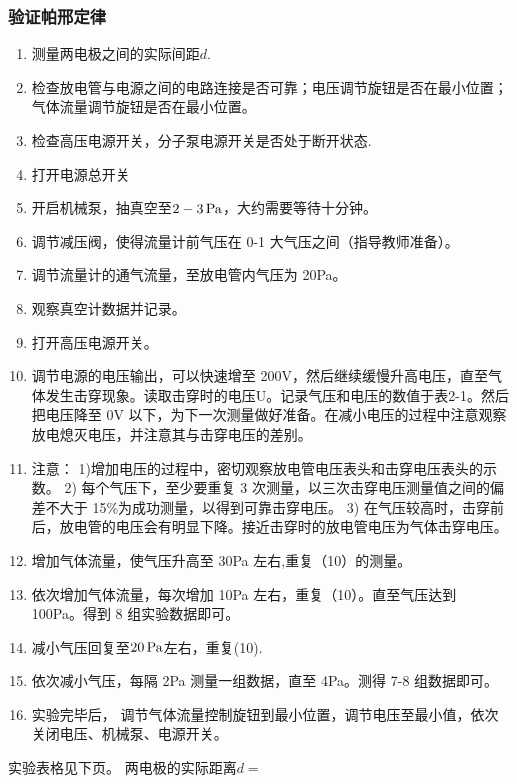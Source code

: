 \documentclass{ctexart}
\begin{document}
\subsubsection{验证帕邢定律}
\begin{enumerate}
\item 测量两电极之间的实际间距$d$.
\item 检查放电管与电源之间的电路连接是否可靠；电压调节旋钮是否在最小位置；气体流量调节旋钮是否在最小位置。
\item 检查高压电源开关，分子泵电源开关是否处于断开状态.
\item 打开电源总开关
\item 开启机械泵，抽真空至$2-3 \,\mathrm{Pa}$，大约需要等待十分钟。
\item  调节减压阀，使得流量计前气压在 0-1 大气压之间（指导教师准备）。   
\item 调节流量计的通气流量，至放电管内气压为 20Pa。   
\item 观察真空计数据并记录。   
\item 打开高压电源开关。   
\item 调节电源的电压输出，可以快速增至 200V，然后继续缓慢升高电压，直至气体发生击穿现象。读取击穿时的电压U。记录气压和电压的数值于表2-1。然后把电压降至 0V 以下，为下一次测量做好准备。在减小电压的过程中注意观察放电熄灭电压，并注意其与击穿电压的差别。   
\item 注意： 
1)增加电压的过程中，密切观察放电管电压表头和击穿电压表头的示数。 
2) 每个气压下，至少要重复 3 次测量，以三次击穿电压测量值之间的偏差不大于 15\%为成功测量，以得到可靠击穿电压。  
3) 在气压较高时，击穿前后，放电管的电压会有明显下降。接近击穿时的放电管电压为气体击穿电压。
\item 增加气体流量，使气压升高至 30Pa 左右,重复（10）的测量。   
\item 依次增加气体流量，每次增加 10Pa 左右，重复（10）。直至气压达到 100Pa。得到 8 组实验数据即可。
\item 减小气压回复至$20\,\mathrm{Pa}$左右，重复(10).
\item 依次减小气压，每隔 2Pa 测量一组数据，直至 4Pa。测得 7-8 组数据即可。
\item 实验完毕后， 调节气体流量控制旋钮到最小位置，调节电压至最小值，依次关闭电压、机械泵、电源开关。
\end{enumerate}

实验表格见下页。
\newpage
两电极的实际距离$d = \, $
\end{document}
